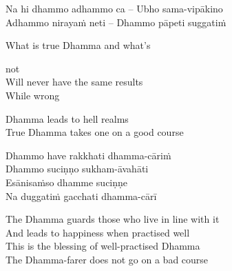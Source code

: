 \suttaRef{[SN 6.2]}

\begin{verses}
  Na hi dhammo adhammo ca – Ubho sama-vipākino\\
  Adhammo nirayaṁ neti – Dhammo pāpeti suggatiṁ
\end{verses}

\begin{english-verses}
    What is true Dhamma and what's\makeatletter\hyperlink{endnote29-appendix}\makeatother

  not\\
  Will never have the same results\\
    While wrong\makeatletter\hyperlink{endnote30-appendix}\makeatother

  Dhamma leads to hell realms\\
  True Dhamma takes one on a good course
\end{english-verses}

\begin{verses}
    Dhammo have rakkhati dhamma-cāriṁ\\
  Dhammo suciṇṇo sukham-āvahāti\\
  Esānisaṁso dhamme suciṇṇe\\
  Na duggatiṁ gacchati dhamma-cārī\makeatletter\hyperlink{endnote31-appendix}\makeatother

\end{verses}

\begin{english-verses}
  The Dhamma guards those who live in line with it\\
  And leads to happiness when practised well\\
  This is the blessing of well-practised Dhamma\\
  The Dhamma-farer does not go on a bad course
\end{english-verses}


